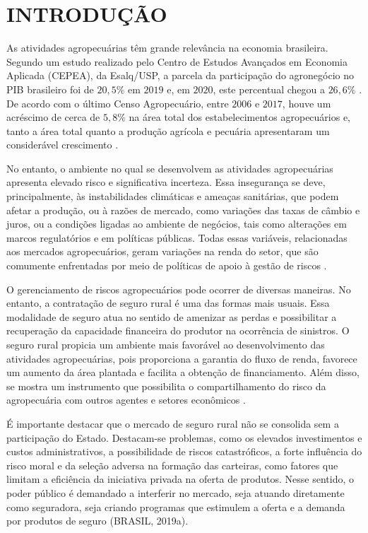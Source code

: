 \section{INTRODUÇÃO}

As atividades agropecuárias têm grande relevância na economia brasileira. Segundo um estudo realizado pelo Centro de Estudos Avançados em Economia Aplicada (CEPEA), da Esalq/USP, a parcela da participação do agronegócio no PIB brasileiro foi de $20,5\%$ em $2019$ e, em $2020$, este percentual chegou a $26,6\%$ \cite{cepea21_2}. De acordo com o último Censo Agropecuário, entre $2006$ e $2017$, houve um acréscimo de cerca de $5,8\%$ na área total dos estabelecimentos agropecuários e, tanto a área total quanto a produção agrícola e pecuária apresentaram um considerável crescimento \cite{ibge19_2}.

No entanto, o ambiente no qual se desenvolvem as atividades agropecuárias apresenta elevado risco e significativa incerteza. Essa insegurança se deve, principalmente, às instabilidades climáticas e ameaças sanitárias, que podem afetar a produção, ou à razões de mercado, como variações das taxas de câmbio e juros, ou a condições ligadas ao ambiente de negócios, tais como alterações em marcos regulatórios e em políticas públicas. Todas essas variáveis, relacionadas aos mercados agropecuários, geram variações na renda do setor, que são comumente enfrentadas por meio de políticas de apoio à gestão de riscos \cite{brasil18_2}.

O gerenciamento de riscos agropecuários pode ocorrer de diversas maneiras. No entanto, a contratação de seguro rural é uma das formas mais usuais. Essa modalidade de seguro atua no sentido de amenizar as perdas e possibilitar a recuperação da capacidade financeira do produtor na ocorrência de sinistros. O seguro rural propicia um ambiente mais favorável ao desenvolvimento das atividades agropecuárias, pois proporciona a garantia do fluxo de renda, favorece um aumento da área plantada e facilita a obtenção de financiamento. Além disso, se mostra um instrumento que possibilita o compartilhamento do risco da agropecuária com outros agentes e setores econômicos \cite{brasil19_2}.

É importante destacar que o mercado de seguro rural não se consolida sem a participação do Estado. Destacam-se problemas, como os elevados investimentos e custos administrativos, a possibilidade de riscos catastróficos, a forte influência do risco moral e da seleção adversa na formação das carteiras, como fatores que limitam a eficiência da iniciativa privada na oferta de produtos. Nesse sentido, o poder público é demandado a interferir no mercado, seja atuando diretamente como seguradora, seja criando programas que estimulem a oferta e a demanda por produtos de seguro (BRASIL, 2019a). 

